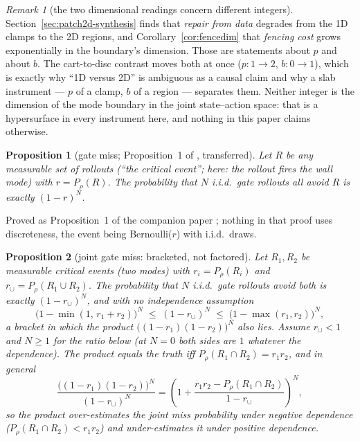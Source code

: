 \documentclass[11pt]{article}
\newtheorem{proposition}{Proposition}
\theoremstyle{definition}
\theoremstyle{remark}
\newtheorem{remark}{Remark}
\begin{document}
\begin{remark}[the two dimensional readings concern different integers]
\label{rem:twodims}
Section~\ref{sec:patch2d-synthesis} finds that \emph{repair from data} degrades from the 1D clamps to the 2D regions, and Corollary~\ref{cor:fencedim} that \emph{fencing cost} grows exponentially in the boundary's dimension. Those are statements about $p$ and about $b$. The cart-to-disc contrast moves both at once ($p: 1 \to 2$, $b: 0 \to 1$), which is exactly why ``1D versus 2D'' is ambiguous as a causal claim and why a slab instrument --- $p$ of a clamp, $b$ of a region --- separates them. Neither integer is the dimension of the mode boundary in the joint state--action space: that is a hypersurface in every instrument here, and nothing in this paper claims otherwise.
\end{remark}

\begin{proposition}[gate miss; Proposition~1 of \citealp{aguilar2026verified}, transferred]
\label{prop:gatemiss}
Let $R$ be any measurable set of rollouts (``the critical event''; here: the rollout fires the wall mode) with $r = P_\rho(R)$. The probability that $N$ i.i.d.\ gate rollouts all avoid $R$ is exactly $(1-r)^N$.
\end{proposition}

Proved as Proposition~1 of the companion paper \citep{aguilar2026verified}; nothing in that proof uses discreteness, the event being Bernoulli($r$) with i.i.d.\ draws.

\begin{proposition}[joint gate miss: bracketed, not factored]
\label{prop:jointmiss}
Let $R_1, R_2$ be measurable critical events (two modes) with $r_i = P_\rho(R_i)$ and $r_\cup = P_\rho(R_1 \cup R_2)$. The probability that $N$ i.i.d.\ gate rollouts avoid \emph{both} is exactly $(1-r_\cup)^N$, and with no independence assumption
\[
  \bigl(1 - \min(1,\, r_1+r_2)\bigr)^N \;\leq\; (1-r_\cup)^N \;\leq\; \bigl(1 - \max(r_1, r_2)\bigr)^N,
\]
a bracket in which the product $\bigl((1-r_1)(1-r_2)\bigr)^N$ also lies. Assume $r_\cup < 1$ and $N \geq 1$ for the ratio below (at $N = 0$ both sides are $1$ whatever the dependence). The product equals the truth iff $P_\rho(R_1 \cap R_2) = r_1 r_2$, and in general
\[
  \frac{\bigl((1-r_1)(1-r_2)\bigr)^N}{(1-r_\cup)^N}
  = \left(1 + \frac{r_1 r_2 - P_\rho(R_1 \cap R_2)}{1-r_\cup}\right)^{\!N},
\]
so the product \emph{over}-estimates the joint miss probability under negative dependence ($P_\rho(R_1 \cap R_2) < r_1 r_2$) and \emph{under}-estimates it under positive dependence.
\end{proposition}
\end{document}
